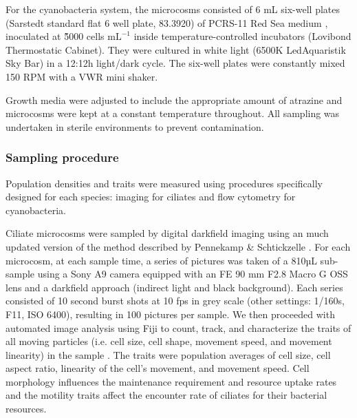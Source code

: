 \documentclass{article}
\begin{document}
For the cyanobacteria system, the microcosms consisted of 6 mL six-well plates (Sarstedt standard flat 6 well plate, 83.3920) of PCRS-11 Red Sea medium \cite{Rippka2000}, inoculated at \~ 5000 cells $\mathrm{mL}^{-1}$ inside temperature-controlled incubators (Lovibond Thermostatic Cabinet). They were cultured in white light (6500K LedAquaristik Sky Bar) in a 12:12h light/dark cycle. The six-well plates were constantly mixed 150 RPM with a VWR mini shaker.

Growth media were adjusted to include the appropriate amount of atrazine and microcosms were kept at a constant temperature throughout. All sampling was undertaken in sterile environments to prevent contamination.

\subsubsection{Sampling procedure}

Population densities and traits were measured using procedures specifically designed for each species: imaging for ciliates and flow cytometry for cyanobacteria.

Ciliate microcosms were sampled by digital darkfield imaging using an much updated version of the method described by  Pennekamp \& Schtickzelle \cite{Pennekamp2013}. For each microcosm, at each sample time, a series of pictures was taken of a 810µL sub-sample using a Sony A9 camera equipped with an FE 90 mm F2.8 Macro G OSS lens and a darkfield approach (indirect light and black background). Each series consisted of 10 second burst shots at 10 fps in grey scale (other settings: 1/160s, F11, ISO 6400), resulting in 100 pictures per sample. We then proceeded with automated image analysis using Fiji \cite{Schindelin2012,VanRossum2022} to count, track, and characterize the traits of all moving particles (i.e. cell size, cell shape, movement speed, and movement linearity) in the sample \cite{Pennekamp2014}. The traits were population averages of cell size, cell aspect ratio, linearity of the cell's movement, and movement speed. Cell morphology influences the maintenance requirement and resource uptake rates and the motility traits affect the encounter rate of ciliates for their bacterial resources. 
\end{document}
